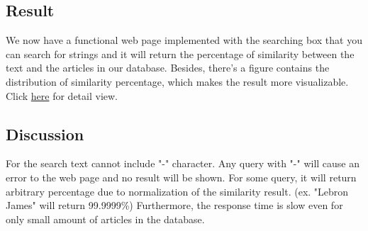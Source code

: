 \subsection{Result}
We now have a functional web page implemented with the searching box that you can search for strings and it will return the percentage of similarity between the text and the articles in our database.
Besides, there's a figure contains the distribution of similarity percentage, which makes the result more visualizable. 
Click \href{http://django.nordlinglab.org}{here} for detail view.

\subsection{Discussion}
For the search text cannot include "-" character. Any query with "-" will cause an error to the web page and no result will be shown. For some query, it will return arbitrary percentage due to normalization of the similarity result. (ex. "Lebron James" will return 99.9999\%)
Furthermore, the response time is slow even for only small amount of articles in the database.